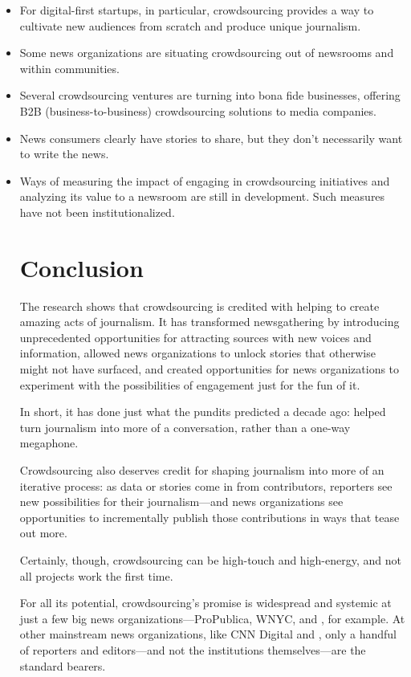 \begin{itemize}
\item For digital-first startups, in particular, crowdsourcing provides a way to cultivate new audiences from scratch and produce unique journalism. 

\item Some news organizations are situating crowdsourcing out of newsrooms and within communities. 

\item Several crowdsourcing ventures are turning into bona fide businesses, offering B2B (business-to-business) crowdsourcing solutions to media companies. 

\item News consumers clearly have stories to share, but they don’t necessarily want to write the news.

\item Ways of measuring the impact of engaging in crowdsourcing initiatives and analyzing its value to a newsroom are still in development. Such measures have not been institutionalized.


\section{Conclusion} 

The research shows that crowdsourcing is credited with helping to create amazing acts of journalism. It has transformed newsgathering by introducing unprecedented opportunities for attracting sources with new voices and information, allowed news organizations to unlock stories that otherwise might not have surfaced, and created opportunities for news organizations to experiment with the possibilities of engagement just for the fun of it.

In short, it has done just what the pundits predicted a decade ago: helped turn journalism into more of a conversation, rather than a one-way megaphone. 

Crowdsourcing also deserves credit for shaping journalism into more of an iterative process: as data or stories come in from contributors, reporters see new possibilities for their journalism---and news organizations see opportunities to incrementally publish those contributions in ways that tease out more. 

Certainly, though, crowdsourcing can be high-touch and high-energy, and not all projects work the first time. 

For all its potential, crowdsourcing’s promise is widespread and systemic at just a few big news organizations---ProPublica, WNYC, and , for example. At other mainstream news organizations, like CNN Digital and , only a handful of reporters and editors---and not the institutions themselves---are the standard bearers. 


\end{itemize}
